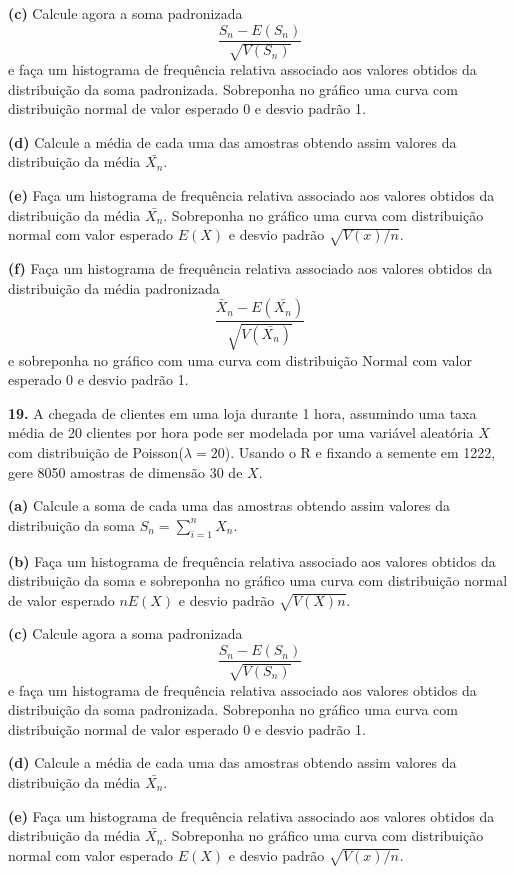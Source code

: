 \documentclass[
]{book}
\begin{document}
\textbf{(c)} Calcule agora a soma padronizada
\[\frac{S_{n}-E(S_{n})}{\sqrt{V(S_{n})}}\] e faça um histograma de
frequência relativa associado aos valores obtidos da distribuição da
soma padronizada. Sobreponha no gráfico uma curva com distribuição
normal de valor esperado 0 e desvio padrão 1.

\textbf{(d)} Calcule a média de cada uma das amostras obtendo assim valores
da distribuição da média \(\bar{X_{n}}\).

\textbf{(e)} Faça um histograma de frequência relativa associado aos valores
obtidos da distribuição da média \(\bar{X_{n}}\). Sobreponha no gráfico
uma curva com distribuição normal com valor esperado \(E(X)\) e desvio
padrão \(\sqrt{V(x)/n}\).

\textbf{(f)} Faça um histograma de frequência relativa associado aos valores
obtidos da distribuição da média padronizada
\[\frac{\bar{X}_{n}-E(\bar{X_{n}})}{\sqrt{V(\bar{X_{n}})}}\] e
sobreponha no gráfico com uma curva com distribuição Normal com valor
esperado 0 e desvio padrão 1.

\textbf{19.} A chegada de clientes em uma loja durante 1 hora, assumindo uma
taxa média de 20 clientes por hora pode ser modelada por uma variável
aleatória \(X\) com distribuição de Poisson(\(\lambda=20\)). Usando o R e
fixando a semente em 1222, gere 8050 amostras de dimensão 30 de \(X\).

\textbf{(a)} Calcule a soma de cada uma das amostras obtendo assim valores da
distribuição da soma \(S_{n} = \sum_{i=1}^{n}X_{n}\).

\textbf{(b)} Faça um histograma de frequência relativa associado aos valores
obtidos da distribuição da soma e sobreponha no gráfico uma curva com
distribuição normal de valor esperado \(nE(X)\) e desvio padrão
\(\sqrt{V(X)n}\).

\textbf{(c)} Calcule agora a soma padronizada
\[\frac{S_{n}-E(S_{n})}{\sqrt{V(S_{n})}}\] e faça um histograma de
frequência relativa associado aos valores obtidos da distribuição da
soma padronizada. Sobreponha no gráfico uma curva com distribuição
normal de valor esperado 0 e desvio padrão 1.

\textbf{(d)} Calcule a média de cada uma das amostras obtendo assim valores
da distribuição da média \(\bar{X_{n}}\).

\textbf{(e)} Faça um histograma de frequência relativa associado aos valores
obtidos da distribuição da média \(\bar{X_{n}}\). Sobreponha no gráfico
uma curva com distribuição normal com valor esperado \(E(X)\) e desvio
padrão \(\sqrt{V(x)/n}\).
\end{document}
